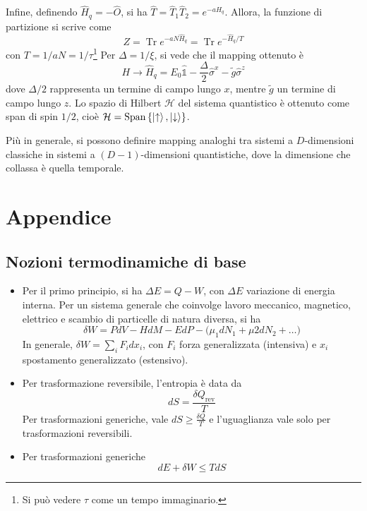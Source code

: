\documentclass[11pt, a4paper]{scrartcl}
\theoremstyle{style}
\theoremstyle{style1}
\numberwithin{equation}{subsection}
\begin{document}
Infine, definendo $\hat{H}_q = - \hat{O}$, si ha $\hat{T} = \hat{T}_1 \hat{T}_2 = e^{-a \hat{H}_q}$.
Allora, la funzione di partizione si scrive come
\[
Z = \operatorname{Tr} e^{-a N\hat{H}_q} = \operatorname{Tr} e^{-\hat{H}_q / T}
\] 
con $T = 1 / aN = 1 / \tau $\footnote{Si pu\`o vedere $\tau $ come un tempo immaginario.}
Per $\Delta  = 1 / \xi $, si vede che il mapping ottenuto \`e 
\[
	H \longrightarrow \hat{H}_q = E_0 \hat{\mathds{1}} - \frac{\Delta }{2} \hat{\sigma }^x - \tilde{g}\hat{\sigma }^z
\] 
dove $\Delta /2$ rappresenta un termine di campo lungo $x$, mentre $\tilde{g}$ un termine di campo lungo $z$.
Lo spazio di Hilbert $\mathcal{H} $ del sistema quantistico \`e ottenuto come span di spin $1 / 2$, cio\`e $\mathcal{H} = \operatorname{Span}  \left\{ \ket{\uparrow} ,\ket{\downarrow}  \right\} $.

Pi\`u in generale, si possono definire mapping analoghi tra sistemi a $D$-dimensioni classiche in sistemi a $(D-1)$-dimensioni quantistiche, dove la dimensione che collassa \`e quella temporale.

\newpage


\appendix

\section{Appendice}
\subsection{Nozioni termodinamiche di base}
\begin{itemize}
	\item Per il primo principio, si ha $\Delta E = Q - W$, con $\Delta E $ variazione di energia interna.
		Per un sistema generale che coinvolge lavoro meccanico, magnetico, elettrico e scambio di particelle di natura diversa, si ha
		\[
		\delta W =P dV - H  dM - E dP - \big(\mu _1 dN_1 + \mu 2 dN_2 +\ldots\big) 
		\] 
	In generale, $\delta W = \sum_{i}^{} F_i dx_i$, con $F_i$ forza generalizzata (intensiva) e $x_i$ spostamento generalizzato (estensivo).
\item Per trasformazione reversibile, l'entropia \`e data da 
	\begin{equation}
	dS = \frac{\delta Q_\text{rev}}{T}
	\end{equation}
	Per trasformazioni generiche, vale $dS \ge \frac{\delta Q}{T}$ e l'uguaglianza vale solo per trasformazioni reversibili.
\item Per trasformazioni generiche
	 \begin{equation}
	 	dE + \delta W \le TdS
	 \end{equation}
\end{itemize}
\end{document}
